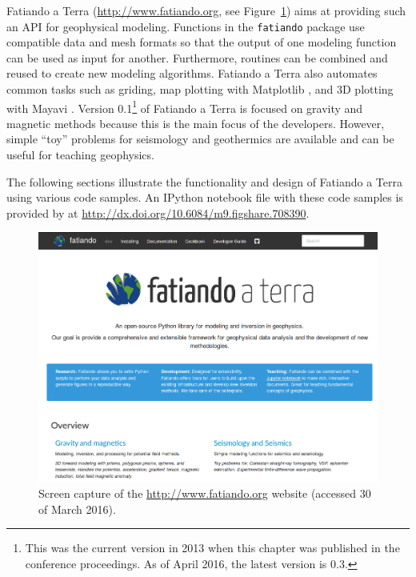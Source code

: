Fatiando a Terra (\url{http://www.fatiando.org}, see
Figure~\ref{fig:p1-fatiando-site}) aims at providing such an API
for geophysical modeling. Functions in the \texttt{fatiando} package use
compatible data and mesh formats so that the output of one modeling function
can be used as input for another. Furthermore, routines can be combined and
reused to create new modeling algorithms.  Fatiando a Terra also automates
common tasks such as griding, map plotting with Matplotlib \citep[][
\url{http://matplotlib.org}]{hunter2007}, and 3D plotting with Mayavi \citep[][
\url{http://code.enthought.com/projects/mayavi}]{ramachandran2011}.  Version
0.1\footnote{
    This was the current version in 2013 when this chapter was published in the
    conference proceedings. As of April 2016, the latest version is 0.3.}
of Fatiando a Terra is focused on gravity and magnetic methods because this is
the main focus of the developers.  However, simple ``toy'' problems for
seismology and geothermics are available and can be useful for teaching
geophysics.

The following sections illustrate the functionality and design of Fatiando a
Terra using various code samples. An IPython \citep[][
\url{http://ipython.org/}]{perez2007} notebook file with these code samples is
provided by \citet{uieda2013} at
\url{http://dx.doi.org/10.6084/m9.figshare.708390}.

\begin{figure}
    \centering
    \includegraphics[width=\textwidth]{figures/paper-fatiando/screen-capture-fatiando-org-30-03-2016.png}
    \caption{
        Screen capture of the \url{http://www.fatiando.org} website (accessed
        30 of March 2016).
    }
    \label{fig:p1-fatiando-site}
\end{figure}



